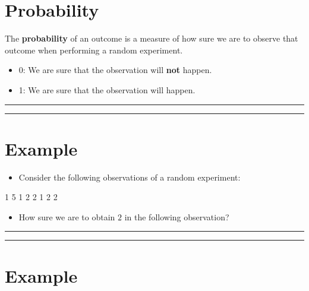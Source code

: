 \documentclass[
]{book}
\providecommand{\tightlist}{%
  \setlength{\itemsep}{0pt}\setlength{\parskip}{0pt}}
\begin{document}
\hypertarget{probability-1}{%
\section{Probability}\label{probability-1}}

The \textbf{probability} of an outcome is a measure of how sure we are to observe that outcome when performing a random experiment.

\begin{itemize}
\item
  0: We are sure that the observation will \textbf{not} happen.
\item
  1: We are sure that the observation will happen.
\end{itemize}

\begin{center}\rule{0.5\linewidth}{0.5pt}\end{center}

\begin{center}\rule{0.5\linewidth}{0.5pt}\end{center}

\hypertarget{example-3}{%
\section{Example}\label{example-3}}

\begin{itemize}
\tightlist
\item
  Consider the following observations of a random experiment:
\end{itemize}

1 5 1 2 2 1 2 2

\begin{itemize}
\tightlist
\item
  How sure we are to obtain \(2\) in the following observation?
\end{itemize}

\begin{center}\rule{0.5\linewidth}{0.5pt}\end{center}

\begin{center}\rule{0.5\linewidth}{0.5pt}\end{center}

\hypertarget{example-4}{%
\section{Example}\label{example-4}}
\end{document}
